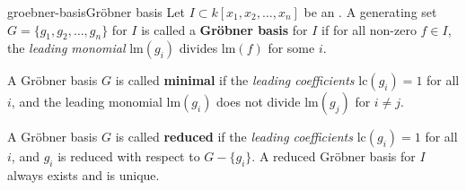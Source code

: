 \begin{topic}{groebner-basis}{Gröbner basis}
    Let $I \subset k[x_1, x_2, \ldots, x_n]$ be an . A generating set $G = \{ g_1, g_2, \ldots, g_n \}$ for $I$ is called a \textbf{Gröbner basis} for $I$ if for all non-zero $f \in I$, the \textit{leading monomial} $\text{lm}(g_i)$ divides $\text{lm}(f)$ for some $i$.
    
    A Gröbner basis $G$ is called \textbf{minimal} if the \textit{leading coefficients} $\text{lc}(g_i) = 1$ for all $i$, and the leading monomial $\text{lm}(g_i)$ does not divide $\text{lm}(g_j)$ for $i \ne j$.
    
    A Gröbner basis $G$ is called \textbf{reduced} if the \textit{leading coefficients} $\text{lc}(g_i) = 1$ for all $i$, and $g_i$ is reduced with respect to $G - \{ g_i \}$. A reduced Gröbner basis for $I$ always exists and is unique.
\end{topic}
